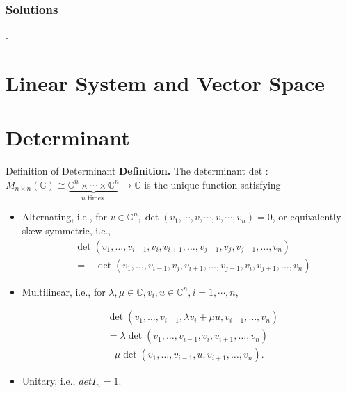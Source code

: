 \documentclass[aspectratio=169, UTF8]{ctexbeamer}
\begin{document}
\begin{frame}
    \frametitle{Solutions}.
\end{frame}

\section{Linear System and Vector Space}


\section{Determinant}
\begin{frame}[label=3]{Definition of Determinant}
\textbf{Definition.} The determinant det : $M_{n \times n}(\mathbb{C}) \cong \underbrace{\mathbb{C}^{n} \times \cdots \times \mathbb{C}^{n}}_{n \text { times }} \rightarrow \mathbb{C}$ is the unique function satisfying
\begin{itemize}
    \item Alternating, i.e., for $v \in \mathbb{C}^{n}, \operatorname{det}\left(v_{1}, \cdots, v, \cdots, v, \cdots, v_{n}\right)=0$, or equivalently  skew-symmetric, i.e.,
    $$
\begin{aligned}
& \operatorname{det}\left(v_{1}, \ldots, v_{i-1}, v_{i}, v_{i+1}, \ldots, v_{j-1}, v_{j}, v_{j+1}, \ldots, v_{n}\right) \\
& =-\operatorname{det}\left(v_{1}, \ldots, v_{i-1}, v_{j}, v_{i+1}, \ldots, v_{j-1}, v_{i}, v_{j+1}, \ldots, v_{n}\right)
\end{aligned}
$$

\item Multilinear, i.e., for $\lambda, \mu \in \mathbb{C}, v_{i}, u \in \mathbb{C}^{n}, i=1, \cdots, n$,

$$
\begin{aligned}
& \operatorname{det}\left(v_{1}, \ldots, v_{i-1}, \lambda v_{i}+\mu u, v_{i+1}, \ldots, v_{n}\right) \\
& =\lambda \operatorname{det}\left(v_{1}, \ldots, v_{i-1}, v_{i}, v_{i+1}, \ldots, v_{n}\right) \\
& +\mu \operatorname{det}\left(v_{1}, \ldots, v_{i-1}, u, v_{i+1}, \ldots, v_{n}\right) .
\end{aligned}
$$
\item Unitary, i.e., $det I_n = 1.$
\end{itemize}

\end{frame}
\end{document}
